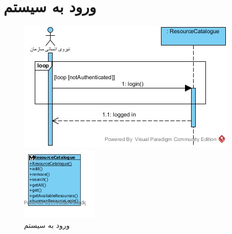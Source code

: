 \section{ورود به سیستم}
\begin{figure}[H]
	\centering
	\includegraphics[scale=1]{img/sequence-analysis/SignIn}
	
	
	\includegraphics[scale=1]{img/sequence-analysis/SignInC}
	\caption{ورود به سیستم}
\end{figure}